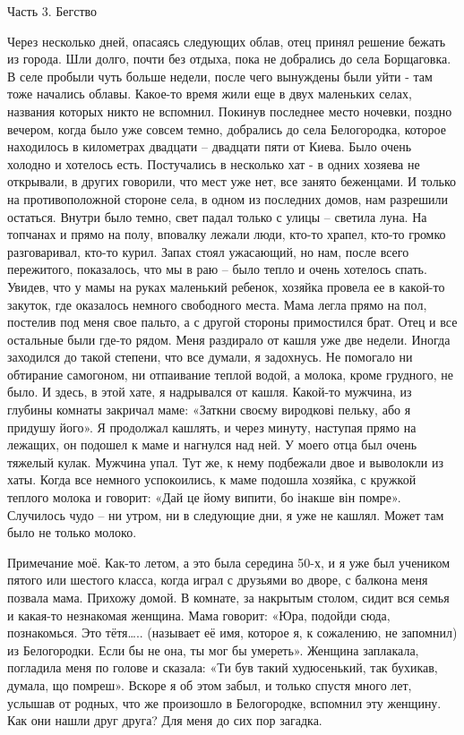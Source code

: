 Часть 3. Бегство

Через несколько дней, опасаясь следующих облав, отец принял решение бежать из
города. Шли долго, почти без отдыха, пока не добрались до села Борщаговка. В
селе пробыли чуть больше недели, после чего вынуждены были уйти - там тоже
начались облавы. Какое-то время жили еще в двух маленьких селах, названия
которых никто не вспомнил. Покинув последнее место ночевки, поздно вечером,
когда было уже совсем темно, добрались до села Белогородка, которое находилось
в километрах двадцати – двадцати пяти от Киева. Было очень холодно и хотелось
есть. Постучались в несколько хат - в одних хозяева не открывали, в других
говорили, что мест уже нет, все занято беженцами. И только на противоположной
стороне села, в одном из последних домов, нам разрешили остаться. Внутри было
темно, свет падал только с улицы – светила луна. На топчанах и прямо на полу,
вповалку лежали люди, кто-то храпел, кто-то громко разговаривал, кто-то курил.
Запах стоял ужасающий, но нам, после всего пережитого, показалось, что мы в раю
– было тепло и очень хотелось спать. Увидев, что у мамы на руках маленький
ребенок, хозяйка провела ее в какой-то закуток, где оказалось немного
свободного места. Мама легла прямо на пол, постелив под меня свое пальто, а с
другой стороны примостился брат. Отец и все остальные были где-то рядом. Меня
раздирало от кашля уже две недели. Иногда заходился до такой степени, что все
думали, я задохнусь. Не помогало ни обтирание самогоном, ни отпаивание теплой
водой, а молока, кроме грудного, не было. И здесь, в этой хате, я надрывался от
кашля. Какой-то мужчина, из глубины комнаты закричал маме: «Заткни своєму
виродкові пельку, або я придушу його». Я продолжал кашлять, и через минуту,
наступая прямо на лежащих, он подошел к маме и нагнулся над ней. У моего отца
был очень тяжелый кулак. Мужчина упал. Тут же, к нему подбежали двое и
выволокли из хаты. Когда все немного успокоились, к маме подошла хозяйка, с
кружкой теплого молока и говорит: «Дай це йому випити, бо інакше він помре».
Случилось чудо – ни утром, ни в следующие дни, я уже не кашлял. Может там было
не только молоко.

Примечание моё. Как-то летом, а это была середина 50-х, и я уже был учеником
пятого или шестого класса, когда играл с друзьями во дворе, с балкона меня
позвала мама. Прихожу домой. В комнате, за накрытым столом, сидит вся семья и
какая-то незнакомая женщина. Мама говорит: «Юра, подойди сюда, познакомься. Это
тётя….. (называет её имя, которое я, к сожалению, не запомнил) из Белогородки.
Если бы не она, ты мог бы умереть». Женщина заплакала, погладила меня по голове
и сказала: «Ти був такий худюсенький, так бухикав, думала, що помреш». Вскоре я
об этом забыл, и только спустя много лет, услышав от родных, что же произошло в
Белогородке, вспомнил эту женщину. Как они нашли друг друга? Для меня до сих
пор загадка.

